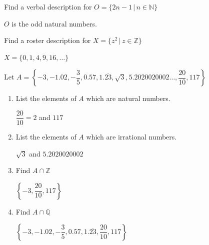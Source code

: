 \documentclass{ximera}
\begin{document}
	\author{Stitz-Zeager}



\label{ExercisesforAppSetTheory}

\begin{problem}
Find a verbal description for $O = \{ 2n-1 \, | \, n \in \mathbb{N}\}$    

\begin{solution}
     $O$ is the odd natural numbers.
\end{solution}

\end{problem}

\begin{problem}
Find a roster description for $X = \{ z^2 \, | \, z \in \mathbb{Z}\}$    

\begin{solution}
    $X = \{ 0, 1, 4, 9, 16, \ldots \}$
\end{solution}

\end{problem}
 
\begin{problem}
Let $A = \left\{ -3, -1.02, -\dfrac{3}{5}, 0.57, 1.\overline{23}, \sqrt{3}, 5.2020020002 \ldots, \dfrac{20}{10}, 117 \right\}$ 

\begin{enumerate}

\item  List the elements of $A$ which are natural numbers.

\begin{solution}
    $\dfrac{20}{10} = 2$ and $117$
\end{solution}

\item  List the elements of $A$ which are irrational numbers.

\begin{solution}
    $\sqrt{3}$ and $5.2020020002$
\end{solution}

\item  Find $A \cap \mathbb{Z}$

\begin{solution}
    $\left\{ -3, \dfrac{20}{10}, 117\right\}$
\end{solution}

\item  Find $A \cap \mathbb{Q}$

\begin{solution}
    $\left\{ -3, -1.02, -\dfrac{3}{5}, 0.57, 1.\overline{23},\dfrac{20}{10}, 117 \right \}$
\end{solution}

\end{enumerate}
\end{problem}
\end{document}
